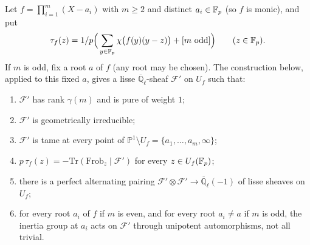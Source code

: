 \begin{lemma}[The sheaf of the family $y^2=f(x)(x-z)$]\label{lem:dl:sheaf}
Let $f=\prod_{i=1}^m(X-a_i)$ with $m\ge2$ and distinct $a_i\in\mathbb F_p$ \textup(so
$f$ is monic\textup), and put
\[
  \tau_f(z)=1/p\Big(\sum_{y\in\mathbb F_p}\chi\big(f(y)(y-z)\big)+[m\text{ odd}]\Big)
  \qquad(z\in\mathbb F_p).
\]
If $m$ is odd, fix a root $a$ of $f$ \textup(any root may be
chosen\textup). The construction below, applied to this fixed
$a$, gives a lisse $\overline{\mathbb Q}_\ell$-sheaf
$\mathcal F'$ on $U_f$ such that:
\begin{enumerate}[label=\textup{(\roman*)}]
\item $\mathcal F'$ has rank $\gamma(m)$ and is pure of weight $1$;
\item $\mathcal F'$ is geometrically irreducible;
\item $\mathcal F'$ is tame at every point of
  $\mathbb P^1\setminus U_f=\{a_1,\dots,a_m,\infty\}$;
\item $p\,\tau_f(z)=-\mathrm{Tr}(\mathrm{Frob}_z\mid\mathcal F')$ for every
  $z\in U_f(\mathbb F_p)$;
\item there is a perfect alternating pairing
  $\mathcal F'\otimes\mathcal F'\to\overline{\mathbb Q}_\ell(-1)$ of lisse sheaves
  on $U_f$;
\item for every root $a_i$ of $f$ if $m$ is even, and for every root $a_i\ne a$
  if $m$ is odd, the inertia group at $a_i$ acts on $\mathcal F'$ through
  unipotent automorphisms, not all trivial.
\end{enumerate}
\end{lemma}

